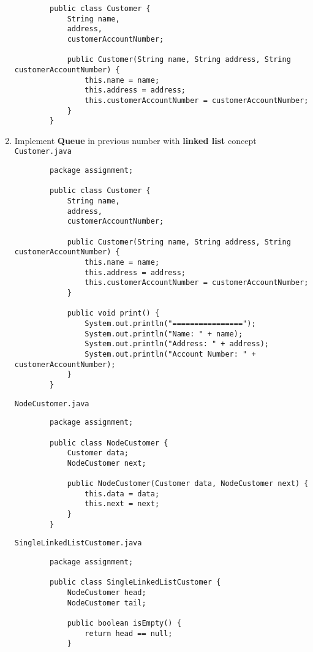 \documentclass[12pt,titlepage]{article}
\begin{document}
\begin{enumerate}
\begin{verbatim}
        public class Customer {
            String name,
            address,
            customerAccountNumber;

            public Customer(String name, String address, String customerAccountNumber) {
                this.name = name;
                this.address = address;
                this.customerAccountNumber = customerAccountNumber;
            }
        }
    \end{verbatim}
    \item Implement \textbf{Queue} in previous number with \textbf{linked list} concept
    \texttt{Customer.java}
    \begin{verbatim}
        package assignment;

        public class Customer {
            String name,
            address,
            customerAccountNumber;

            public Customer(String name, String address, String customerAccountNumber) {
                this.name = name;
                this.address = address;
                this.customerAccountNumber = customerAccountNumber;
            }

            public void print() {
                System.out.println("================");
                System.out.println("Name: " + name);
                System.out.println("Address: " + address);
                System.out.println("Account Number: " + customerAccountNumber);
            }
        }
    \end{verbatim}
    \texttt{NodeCustomer.java}
    \begin{verbatim}
        package assignment;

        public class NodeCustomer {
            Customer data;
            NodeCustomer next;

            public NodeCustomer(Customer data, NodeCustomer next) {
                this.data = data;
                this.next = next;
            }
        }
    \end{verbatim}
    \texttt{SingleLinkedListCustomer.java}
    \begin{verbatim}
        package assignment;

        public class SingleLinkedListCustomer {
            NodeCustomer head;
            NodeCustomer tail;

            public boolean isEmpty() {
                return head == null;
            }


\end{verbatim}
\end{enumerate}
\end{document}
